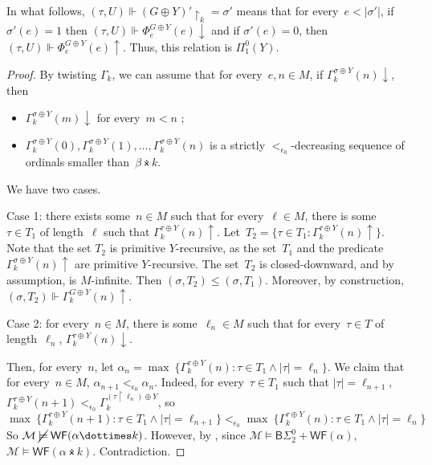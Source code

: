 \documentclass{article}
\numberwithin{theorem}{section}
\newtheorem{lemma}[theorem]{Lemma}
\newcommand{\BSig}{\mathsf{B}\Sigma^0}
\newcommand{\WF}{\mathsf{WF}}
\newcommand{\M}{\mathcal{M}}
\newcommand{\uh}[0]{{\upharpoonright}}
\newcommand{\ntimes}{\dottimes}
\begin{document}
In what follows, $(\tau, U) \Vdash (G \oplus Y)' \uh_k = \sigma'$ means that for every~$e < |\sigma'|$, if $\sigma'(e) = 1$ then $(\tau, U) \Vdash \Phi^{G \oplus Y}_e(e)\downarrow$ and if $\sigma'(e) = 0$, then $(\tau, U) \Vdash \Phi^{G \oplus Y}_e(e)\uparrow$. Thus, this relation is $\Pi^0_1(Y)$.


\begin{proof}
By twisting $\Gamma_k$, we can assume that for every~$e, n \in M$, if $\Gamma^{\sigma \oplus Y}_k(n)\downarrow$, then
\begin{itemize}
    \item $\Gamma^{\sigma \oplus Y}_k(m)\downarrow$ for every~$m < n$ ;
    \item $\Gamma^{\sigma \oplus Y}_k(0), \Gamma^{\sigma \oplus Y}_k(1), \dots, \Gamma^{\sigma \oplus Y}_k(n)$ is a strictly $<_{\epsilon_0}$-decreasing sequence of ordinals smaller than~$\beta \ntimes k$.
\end{itemize}
We have two cases.

Case 1: there exists some~$n \in M$ such that for every~$\ell \in M$, there is some~$\tau \in T_1$ of length~$\ell$ such that $\Gamma^{\tau \oplus Y}_k(n)\uparrow$. Let~$T_2 = \{ \tau \in T_1 : \Gamma^{\tau \oplus Y}_k(n)\uparrow \}$. Note that the set $T_2$ is primitive $Y$-recursive, as the set~$T_1$ and the predicate $\Gamma^{\sigma \oplus Y}_k(n)\uparrow$ are primitive $Y$-recursive. The set~$T_2$ is closed-downward, and by assumption, is $M$-infinite. Then $(\sigma, T_2) \leq (\sigma, T_1)$. Moreover, by construction, $(\sigma, T_2) \Vdash \Gamma_k^{G \oplus Y}(n)\uparrow$.


Case 2: for every~$n \in M$, there is some~$\ell_n \in M$ such that 
for every~$\tau \in T$ of length~$\ell_n$, $\Gamma^{\tau \oplus Y}_k(n)\downarrow$.

Then, for every~$n$, let $\alpha_n = \max\ \{ \Gamma^{\tau \oplus Y}_k(n) : \tau \in T_1 \wedge |\tau| = \ell_n \}$.
We claim that for every~$n \in M$, $\alpha_{n+1} <_{\epsilon_0} \alpha_n$.
Indeed, for every~$\tau \in T_1$ such that $|\tau| = \ell_{n+1}$, $\Gamma^{\tau \oplus Y}_k(n+1) <_{\epsilon_0} \Gamma^{(\tau \uh \ell_n) \oplus Y}_k$, so
$$
\max\ \{ \Gamma^{\tau \oplus Y}_k(n+1) : \tau \in T_1 \wedge |\tau| = \ell_{n+1} \}
<_{\epsilon_0} \max\ \{ \Gamma^{\tau \oplus Y}_k(n) : \tau \in T_1 \wedge |\tau| = \ell_n \}
$$
So $\M \mathbin{\cancel{\models}} \WF(\alpha \ntimes k)$. However, by , since $\M \models \BSig_2 + \WF(\alpha)$, $\M \models \WF(\alpha \ntimes k)$. Contradiction.
\end{proof}
\end{document}
